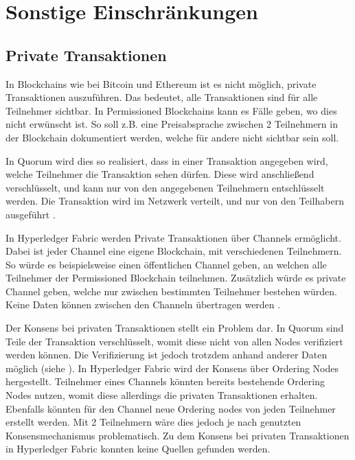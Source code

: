 \section{Sonstige Einschränkungen}

\subsection{Private Transaktionen}
In Blockchains wie bei Bitcoin und Ethereum ist es nicht möglich, private Transaktionen auszuführen. Das bedeutet, alle Transaktionen sind für alle Teilnehmer sichtbar. In Permissioned Blockchains kann es Fälle geben, wo dies nicht erwünscht ist. So soll z.B. eine Preisabsprache zwischen 2 Teilnehmern in der Blockchain dokumentiert werden, welche für andere nicht sichtbar sein soll.

In Quorum wird dies so realisiert, dass in einer Transaktion angegeben wird, welche Teilnehmer die Transaktion sehen dürfen. Diese wird anschließend verschlüsselt, und kann nur von den angegebenen Teilnehmern entschlüsselt werden. Die Transaktion wird im Netzwerk verteilt, und nur von den Teilhabern ausgeführt \cite{QuorumTeamTransactionProcessingQuorum2018}.

In Hyperledger Fabric werden Private Transaktionen über Channels ermöglicht. Dabei ist jeder Channel eine eigene Blockchain, mit verschiedenen Teilnehmern. So würde es beispielsweise einen öffentlichen Channel geben, an welchen alle Teilnehmer der Permissioned Blockchain teilnehmen. Zusätzlich würde es private Channel geben, welche nur zwischen bestimmten Teilnehmer bestehen würden. Keine Daten können zwischen den Channeln übertragen werden \cite{SchererPerformanceScalabilityBlockchain2017}. 

Der Konsens bei privaten Transaktionen stellt ein Problem dar. In Quorum sind Teile der Transaktion verschlüsselt, womit diese nicht von allen Nodes verifiziert werden können. Die Verifizierung ist jedoch trotzdem anhand anderer Daten möglich (siehe \cite{QuorumChainConsensus2018}). In Hyperledger Fabric wird der Konsens über Ordering Nodes hergestellt. Teilnehmer eines Channels könnten bereits bestehende Ordering Nodes nutzen, womit diese allerdings die privaten Transaktionen erhalten. Ebenfalls könnten für den Channel neue Ordering nodes von jeden Teilnehmer erstellt werden. Mit 2 Teilnehmern wäre dies jedoch je nach genutzten Konsensmechanismus problematisch. Zu dem Konsens bei privaten Transaktionen in Hyperledger Fabric konnten keine Quellen gefunden werden.

